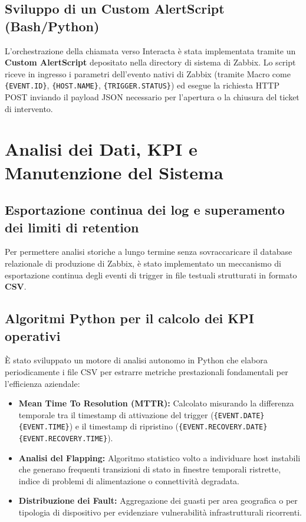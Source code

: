 \documentclass[12pt, a4paper]{report}
\begin{document}
\section{Sviluppo di un Custom AlertScript (Bash/Python)}
L'orchestrazione della chiamata verso Interacta \`e stata implementata tramite un \textbf{Custom AlertScript} depositato nella directory di sistema di Zabbix. Lo script riceve in ingresso i parametri dell'evento nativi di Zabbix (tramite Macro come \texttt{\{EVENT.ID\}}, \texttt{\{HOST.NAME\}}, \texttt{\{TRIGGER.STATUS\}}) ed esegue la richiesta HTTP POST inviando il payload JSON necessario per l'apertura o la chiusura del ticket di intervento.

\clearpage

\chapter{Analisi dei Dati, KPI e Manutenzione del Sistema}
\section{Esportazione continua dei log e superamento dei limiti di retention}
Per permettere analisi storiche a lungo termine senza sovraccaricare il database relazionale di produzione di Zabbix, \`e stato implementato un meccanismo di esportazione continua degli eventi di trigger in file testuali strutturati in formato \textbf{CSV}. 

\section{Algoritmi Python per il calcolo dei KPI operativi}
\`E stato sviluppato un motore di analisi autonomo in Python che elabora periodicamente i file CSV per estrarre metriche prestazionali fondamentali per l'efficienza aziendale:
\begin{itemize}
    \item \textbf{Mean Time To Resolution (MTTR):} Calcolato misurando la differenza temporale tra il timestamp di attivazione del trigger (\texttt{\{EVENT.DATE\} \{EVENT.TIME\}}) e il timestamp di ripristino (\texttt{\{EVENT.RECOVERY.DATE\} \{EVENT.RECOVERY.TIME\}}).
    \item \textbf{Analisi del Flapping:} Algoritmo statistico volto a individuare host instabili che generano frequenti transizioni di stato in finestre temporali ristrette, indice di problemi di alimentazione o connettivit\`a degradata.
    \item \textbf{Distribuzione dei Fault:} Aggregazione dei guasti per area geografica o per tipologia di dispositivo per evidenziare vulnerabilit\`a infrastrutturali ricorrenti.
\end{itemize}
\end{document}
